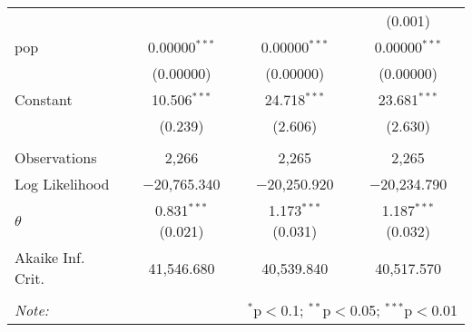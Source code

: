 \begin{table}[!htbp]
\begin{tabular}{@{\extracolsep{5pt}}lccc}
  &  &  & (0.001) \\ 
  pop & 0.00000$^{***}$ & 0.00000$^{***}$ & 0.00000$^{***}$ \\ 
  & (0.00000) & (0.00000) & (0.00000) \\ 
  Constant & 10.506$^{***}$ & 24.718$^{***}$ & 23.681$^{***}$ \\ 
  & (0.239) & (2.606) & (2.630) \\ 
 \hline \\[-1.8ex] 
Observations & 2,266 & 2,265 & 2,265 \\ 
Log Likelihood & $-$20,765.340 & $-$20,250.920 & $-$20,234.790 \\ 
$\theta$ & 0.831$^{***}$  (0.021) & 1.173$^{***}$  (0.031) & 1.187$^{***}$  (0.032) \\ 
Akaike Inf. Crit. & 41,546.680 & 40,539.840 & 40,517.570 \\ 
\hline 
\hline \\[-1.8ex] 
\textit{Note:}  & \multicolumn{3}{r}{$^{*}$p$<$0.1; $^{**}$p$<$0.05; $^{***}$p$<$0.01} \\ 
\end{tabular} 
\end{table} 
